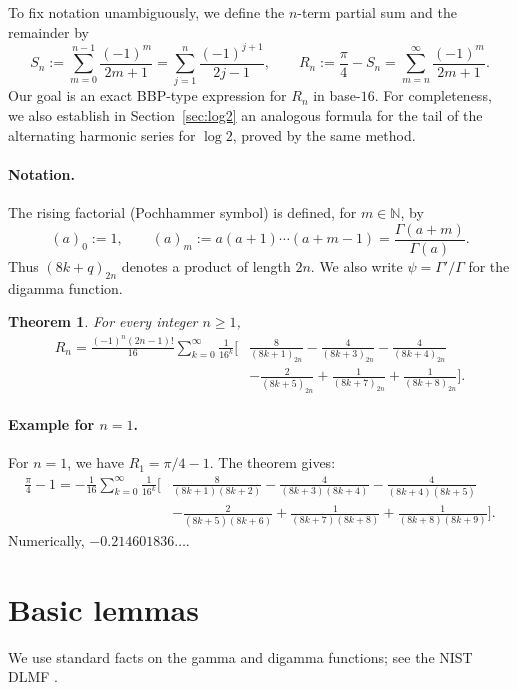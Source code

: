 \documentclass[11pt]{article}
\numberwithin{equation}{section}
\theoremstyle{plain}
\newtheorem{theorem}{Theorem}[section]
\newcommand{\poch}[2]{(#1)_{#2}}      %
\begin{document}
To fix notation unambiguously, we define the $n$-term partial sum
and the remainder by 
\[
S_{n}:=\sum_{m=0}^{n-1}\frac{(-1)^{m}}{2m+1}=\sum_{j=1}^{n}\frac{(-1)^{j+1}}{2j-1},\qquad R_{n}:=\frac{\pi}{4}-S_{n}=\sum_{m=n}^{\infty}\frac{(-1)^{m}}{2m+1}.
\]
Our goal is an exact BBP-type expression for $R_{n}$ in base-$16$. For completeness, we also establish
in Section~\ref{sec:log2} an analogous formula for the tail
of the alternating harmonic series for $\log 2$, proved by the same
method.

\medskip

\paragraph{Notation.}
The rising factorial (Pochhammer symbol) is defined, for $m\in\mathbb{N}$,
by 
\[
(a)_{0}:=1,\qquad(a)_{m}:=a(a+1)\cdots(a+m-1)=\frac{\Gamma(a+m)}{\Gamma(a)}.
\]
Thus $(8k+q)_{2n}$ denotes a product of length $2n$. We also write
$\psi=\Gamma'/\Gamma$ for the digamma function.

\begin{theorem}\label{thm:main} For every integer $n\ge1$, 
\begin{align*}
R_{n}=\frac{(-1)^{n}(2n-1)!}{16}\sum_{k=0}^{\infty}\frac{1}{16^{k}}\Bigg[&\frac{8}{\poch{8k+1}{2n}}-\frac{4}{\poch{8k+3}{2n}}-\frac{4}{\poch{8k+4}{2n}} \\
&-\frac{2}{\poch{8k+5}{2n}}+\frac{1}{\poch{8k+7}{2n}}+\frac{1}{\poch{8k+8}{2n}}\Bigg].
\end{align*}
\end{theorem}

\paragraph{Example for $n=1$.} For $n=1$, we have $R_1 = \pi/4 - 1$. The theorem gives:
\begin{align*}
\frac{\pi}{4}-1 = -\frac{1}{16}\sum_{k=0}^{\infty}\frac{1}{16^{k}}\Bigg[&\frac{8}{(8k+1)(8k+2)}-\frac{4}{(8k+3)(8k+4)}-\frac{4}{(8k+4)(8k+5)} \\
&-\frac{2}{(8k+5)(8k+6)}+\frac{1}{(8k+7)(8k+8)}+\frac{1}{(8k+8)(8k+9)}\Bigg].
\end{align*}
Numerically, $-0.214601836\dots$.

\section{Basic lemmas}

We use standard facts on the gamma and digamma functions; see the
NIST DLMF \cite{DLMF}.
\end{document}
